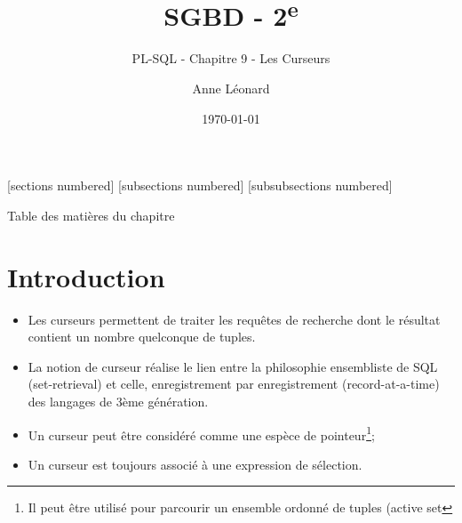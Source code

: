 \documentclass[10pt]{beamer}
\title{SGBD - 2\textsuperscript{e}}
\subtitle{PL-SQL - Chapitre 9 - Les Curseurs}
\date{\today}
\author{Anne Léonard}
\institute{Haute École de la Province de Liège}
\begin{document}
\maketitle

[sections numbered]
[subsections numbered]
[subsubsections numbered]
\begin{frame}[allowframebreaks]{Table des matières du chapitre}
    \tableofcontents[subsectionstyle=show/show/hide,subsubsectionstyle=show/show/hide,]
\end{frame}

\section{Introduction}
\begin{frame}{\secname}
    \begin{itemize}
        \item Les curseurs permettent de traiter les requêtes de recherche dont le résultat contient un nombre quelconque de tuples.
        \item La notion de curseur réalise le lien entre la philosophie ensembliste de SQL (set-retrieval) et celle, enregistrement par enregistrement (record-at-a-time) des langages de 3ème génération.
    \end{itemize}
\end{frame}

\begin{frame}{\secname}
    \begin{itemize}
        \item Un curseur peut être considéré comme une espèce de pointeur\footnote{Il peut être utilisé pour parcourir un ensemble ordonné de tuples (active set};
        \item Un curseur est toujours associé à une expression de sélection.
    \end{itemize}
\end{frame}

\begin{frame}{\secname}
    
\end{frame}
\end{document}
